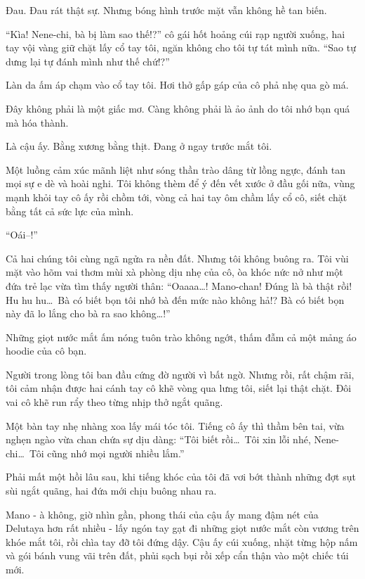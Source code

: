 \documentclass[../main.tex]{subfiles}
\begin{document}
Đau. Đau rát thật sự. Nhưng bóng hình trước mặt vẫn không hề tan biến.

``Kìa! Nene-chi, bà bị làm sao thế!?'' cô gái hốt hoảng cúi rạp người xuống, hai tay vội vàng giữ chặt lấy cổ tay tôi, ngăn không cho tôi tự tát mình nữa. ``Sao tự dưng lại tự đánh mình như thế chứ!?''

Làn da ấm áp chạm vào cổ tay tôi. Hơi thở gấp gáp của cô phả nhẹ qua gò má.

Đây không phải là một giấc mơ. Càng không phải là ảo ảnh do tôi nhớ bạn quá mà hóa thành.

Là cậu ấy. Bằng xương bằng thịt. Đang ở ngay trước mắt tôi.

Một luồng cảm xúc mãnh liệt như sóng thần trào dâng từ lồng ngực, đánh tan mọi sự e dè và hoài nghi. Tôi không thèm để ý đến vết xước ở đầu gối nữa, vùng mạnh khỏi tay cô ấy rồi chồm tới, vòng cả hai tay ôm chầm lấy cổ cô, siết chặt bằng tất cả sức lực của mình.

``Oái--!''

Cả hai chúng tôi cùng ngã ngửa ra nền đất. Nhưng tôi không buông ra. Tôi vùi mặt vào hõm vai thơm mùi xà phòng dịu nhẹ của cô, òa khóc nức nở như một đứa trẻ lạc vừa tìm thấy người thân: ``Oaaaa\dots! Mano-chan! Đúng là bà thật rồi! Hu hu hu\dots\ Bà có biết bọn tôi nhớ bà đến mức nào không hả!? Bà có biết bọn này đã lo lắng cho bà ra sao không\dots!''

Những giọt nước mắt ấm nóng tuôn trào không ngớt, thấm đẫm cả một mảng áo hoodie của cô bạn.

Người trong lòng tôi ban đầu cứng đờ người vì bất ngờ. Nhưng rồi, rất chậm rãi, tôi cảm nhận được hai cánh tay cô khẽ vòng qua lưng tôi, siết lại thật chặt. Đôi vai cô khẽ run rẩy theo từng nhịp thở ngắt quãng.

Một bàn tay nhẹ nhàng xoa lấy mái tóc tôi. Tiếng cô ấy thì thầm bên tai, vừa nghẹn ngào vừa chan chứa sự dịu dàng: ``Tôi biết rồi\dots\ Tôi xin lỗi nhé, Nene-chi\dots\ Tôi cũng nhớ mọi người nhiều lắm.''

\ct

Phải mất một hồi lâu sau, khi tiếng khóc của tôi đã vơi bớt thành những đợt sụt sùi ngắt quãng, hai đứa mới chịu buông nhau ra.

Mano - à không, giờ nhìn gần, phong thái của cậu ấy mang đậm nét của Delutaya hơn rất nhiều - lấy ngón tay gạt đi những giọt nước mắt còn vương trên khóe mắt tôi, rồi chìa tay đỡ tôi đứng dậy. Cậu ấy cúi xuống, nhặt từng hộp nấm và gói bánh vung vãi trên đất, phủi sạch bụi rồi xếp cẩn thận vào một chiếc túi mới.
\end{document}
